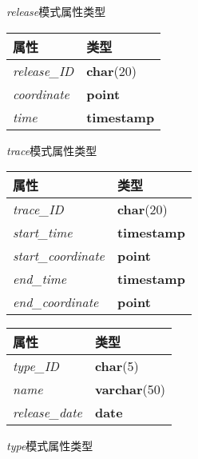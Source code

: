 \begin{figure}[!htp]
    \begin{minipage}{0.3\textwidth}
      \centering
      \caption{\textit{release}模式属性类型}
      \label{tab:release}
      \begin{tabular}{ll}\toprule
        属性&类型\\\midrule
       \textit{release\_ID}&\textbf{char}(20)\\
       \textit{coordinate}&\textbf{point}\\
       \textit{time}&\textbf{timestamp}\\
       \bottomrule
      \end{tabular}
    \end{minipage}\hfill
    \begin{minipage}{0.3\textwidth}
      \centering
      \caption{\textit{trace}模式属性类型}
      \label{tab:trace}
      \begin{tabular}{ll}\toprule
        属性&类型\\\midrule
       \textit{trace\_ID}&\textbf{char}(20)\\
       \textit{start\_time}&\textbf{timestamp}\\
       \textit{start\_coordinate}&\textbf{point}\\
       \textit{end\_time}&\textbf{timestamp}\\
       \textit{end\_coordinate}&\textbf{point}\\
       \bottomrule
      \end{tabular}
    \end{minipage}\hfill
    \begin{minipage}{0.3\textwidth}
      \centering
      \caption{\textit{type}模式属性类型}
      \label{tab:type}
      \begin{tabular}{ll}\toprule
        属性&类型\\\midrule
       \textit{type\_ID}&\textbf{char}(5)\\
       \textit{name}&\textbf{varchar}(50)\\
       \textit{release\_date}&\textbf{date}\\
       \bottomrule
      \end{tabular}
    \end{minipage}\hfill
  \end{figure}

